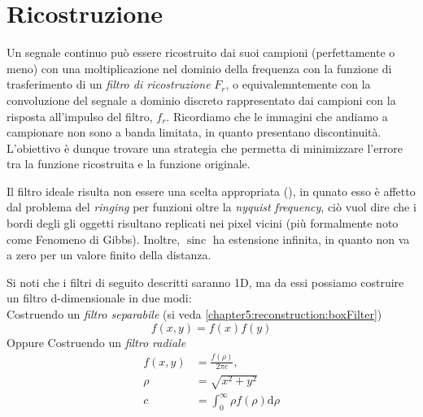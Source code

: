 \section{Ricostruzione}
Un segnale continuo pu\`o essere ricostruito dai suoi campioni (perfettamente o meno) con una moltiplicazione nel dominio della frequenza con la 
funzione di trasferimento di un \textit{filtro di ricostruzione} $F_r$, o equivalemntemente con la convoluzione del segnale a dominio discreto 
rappresentato dai campioni con la risposta all'impulso del filtro, $f_r$. Ricordiamo che le immagini che andiamo a campionare non sono a banda
limitata, in quanto presentano discontinuit\`a. L'obiettivo \`e dunque trovare una strategia che permetta di minimizzare l'errore tra la funzione 
ricostruita e la funzione originale.\par
Il filtro ideale risulta non essere una scelta appropriata (\cite{pharr}), in qunato esso \`e affetto dal problema del \textit{ringing} per funzioni
oltre la \textit{nyquist frequency}, ci\`o vuol dire che i bordi degli gli oggetti risultano replicati nei pixel vicini (pi\`u formalmente noto come 
Fenomeno di Gibbs). Inoltre, $\operatorname{sinc}$ ha estensione infinita, in quanto non va a zero per un valore finito della distanza.\par
Si noti che i filtri di seguito descritti saranno 1D, ma da essi possiamo costruire un filtro d-dimensionale in due modi:\\
Costruendo un \textit{filtro separabile} (si veda \ref{chapter5:reconstruction:boxFilter})
\begin{equation}
	f(x,y)=f(x)f(y)
\end{equation}
Oppure Costruendo un \textit{filtro radiale} 
\begin{align}
	f(x,y)&=\frac{f(\rho)}{2\pi c},\\
	\rho &= \sqrt{x^2+y^2}\nonumber\\
	c &= \int_0^{\infty}\rho f(\rho)\mathrm{d}\rho\nonumber
\end{align}
